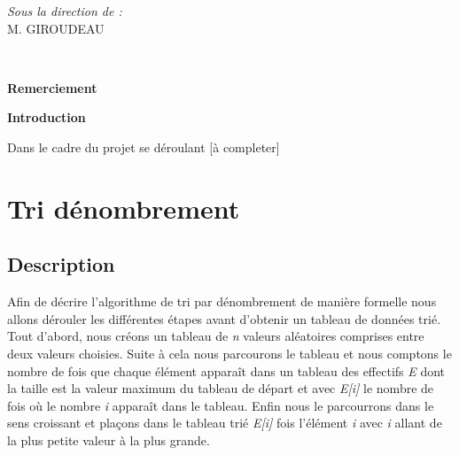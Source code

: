 \documentclass[12pt]{article}
\begin{document}
\begin{titlepage}
\begin{minipage}{0.4\textwidth}
			\begin{flushright} \large
			\emph{Sous la direction de  :} \\
			M. GIROUDEAU\\
        
		\end{flushright}
        
	\end{minipage}\\[2 cm]
	
	
    
    
    
    
	
\end{titlepage}

\LARGE\textbf{Remerciement}\\ \vspace{0.5 cm}

\newpage

\LARGE\textbf{Introduction}\\ \vspace{0.5 cm}

\normalsize{Dans le cadre du projet se déroulant  [à completer]}





\newpage

\tableofcontents

\newpage





\section{Tri dénombrement}

\subsection{Description}



\hspace{1.0 cm} Afin de décrire l'algorithme de tri par dénombrement de manière formelle nous allons dérouler les différentes étapes avant d'obtenir un tableau de données trié. Tout d'abord, nous créons un tableau de \textit{n} valeurs aléatoires comprises entre deux valeurs choisies. Suite à cela nous parcourons le tableau et nous comptons le nombre de fois que chaque élément apparaît dans un tableau des effectifs \textit{E} dont la taille est la valeur maximum du tableau de départ et avec \textit{E[i] }le nombre de fois où le nombre \textit{i} apparaît dans le tableau.
Enfin nous le parcourrons dans le sens croissant et plaçons dans le tableau trié \textit{E[i]} fois l’élément \textit{i} avec \textit{i} allant de la plus petite valeur à la plus grande.
\end{document}
